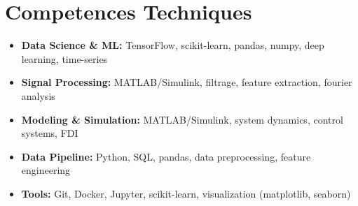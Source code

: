 \documentclass[a4paper,11pt]{article}
\begin{document}
\section{Competences Techniques}
\begin{itemize}[leftmargin=*, nosep]
    \item \small{\textbf{Data Science \& ML:} TensorFlow, scikit-learn, pandas, numpy, deep learning, time-series}
    \item \small{\textbf{Signal Processing:} MATLAB/Simulink, filtrage, feature extraction, fourier analysis}
    \item \small{\textbf{Modeling \& Simulation:} MATLAB/Simulink, system dynamics, control systems, FDI}
    \item \small{\textbf{Data Pipeline:} Python, SQL, pandas, data preprocessing, feature engineering}
    \item \small{\textbf{Tools:} Git, Docker, Jupyter, scikit-learn, visualization (matplotlib, seaborn)}
\end{itemize}
\end{document}
